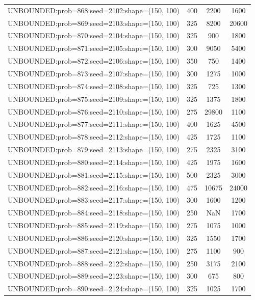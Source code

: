 \begin{longtable}{lccc}
UNBOUNDED:prob=868:seed=2102:shape=(150, 100) &      400 &  2200 &   1600 \\
UNBOUNDED:prob=869:seed=2103:shape=(150, 100) &      325 &  8200 &  20600 \\
UNBOUNDED:prob=870:seed=2104:shape=(150, 100) &      325 &   900 &   1800 \\
UNBOUNDED:prob=871:seed=2105:shape=(150, 100) &      300 &  9050 &   5400 \\
UNBOUNDED:prob=872:seed=2106:shape=(150, 100) &      350 &   750 &   1400 \\
UNBOUNDED:prob=873:seed=2107:shape=(150, 100) &      300 &  1275 &   1000 \\
UNBOUNDED:prob=874:seed=2108:shape=(150, 100) &      325 &   725 &   1300 \\
UNBOUNDED:prob=875:seed=2109:shape=(150, 100) &      325 &  1375 &   1800 \\
UNBOUNDED:prob=876:seed=2110:shape=(150, 100) &      275 & 29800 &   1100 \\
UNBOUNDED:prob=877:seed=2111:shape=(150, 100) &      400 &  1625 &   4500 \\
UNBOUNDED:prob=878:seed=2112:shape=(150, 100) &      425 &  1725 &   1100 \\
UNBOUNDED:prob=879:seed=2113:shape=(150, 100) &      275 &  2325 &   3100 \\
UNBOUNDED:prob=880:seed=2114:shape=(150, 100) &      425 &  1975 &   1600 \\
UNBOUNDED:prob=881:seed=2115:shape=(150, 100) &      500 &  2325 &   3000 \\
UNBOUNDED:prob=882:seed=2116:shape=(150, 100) &      475 & 10675 &  24000 \\
UNBOUNDED:prob=883:seed=2117:shape=(150, 100) &      300 &  1600 &   1200 \\
UNBOUNDED:prob=884:seed=2118:shape=(150, 100) &      250 &   NaN &   1700 \\
UNBOUNDED:prob=885:seed=2119:shape=(150, 100) &      275 &  1075 &   1000 \\
UNBOUNDED:prob=886:seed=2120:shape=(150, 100) &      325 &  1550 &   1700 \\
UNBOUNDED:prob=887:seed=2121:shape=(150, 100) &      275 &  1100 &    900 \\
UNBOUNDED:prob=888:seed=2122:shape=(150, 100) &      250 &  3175 &   2100 \\
UNBOUNDED:prob=889:seed=2123:shape=(150, 100) &      300 &   675 &    800 \\
UNBOUNDED:prob=890:seed=2124:shape=(150, 100) &      325 &  1025 &   1700 \\

\end{longtable}
